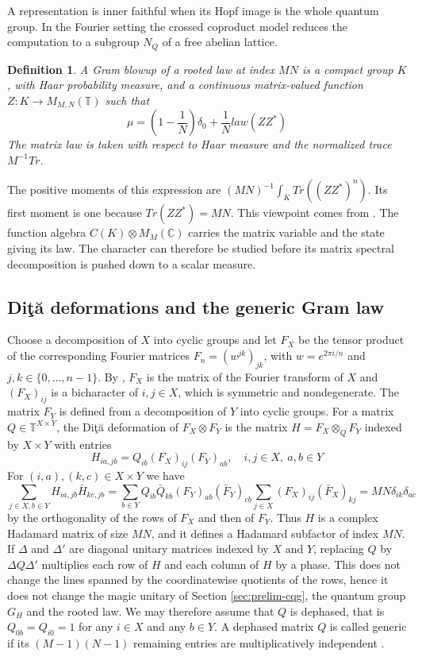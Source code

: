 \documentclass[11pt,reqno]{amsart}
\newtheorem{defi}[thm]{Definition}
\theoremstyle{definition}
\numberwithin{equation}{section}
\begin{document}
A representation is inner faithful when its Hopf image is the whole quantum group. In the Fourier setting the crossed coproduct model reduces the computation to a subgroup $N_Q$ of a free abelian lattice.

\begin{defi}
A Gram blowup of a rooted law at index $MN$ is a compact group $K$, with Haar probability measure, and a continuous matrix-valued function $Z:K\to M_{M,N}(\mathbb T)$ such that
$$\mu=\left(1-\frac1N\right)\delta_0+
\frac1N law(ZZ^*)$$
The matrix law is taken with respect to Haar measure and the normalized trace $M^{-1}Tr$.
\end{defi}

The positive moments of this expression are $(MN)^{-1}\int_K Tr((ZZ^*)^n)$. Its first moment is one because $Tr(ZZ^*)=MN$. This viewpoint comes from \cite{BBi15}. The function algebra $C(K)\otimes M_M(\mathbb C)$ carries the matrix variable and the state giving its law. The character can therefore be studied before its matrix spectral decomposition is pushed down to a scalar measure.

\subsection{Di\c t\u a deformations and the generic Gram law}

Choose a decomposition of $X$ into cyclic groups and let $F_X$ be the tensor product of the corresponding Fourier matrices $F_n=(w^{jk})_{jk}$, with $w=e^{2\pi i/n}$ and $j,k\in\{0,\ldots,n-1\}$. By \cite[Proposition 3.1 (2) and (3)]{BBi15}, $F_X$ is the matrix of the Fourier transform of $X$ and $(F_X)_{ij}$ is a bicharacter of $i,j\in X$, which is symmetric and nondegenerate. The matrix $F_Y$ is defined from a decomposition of $Y$ into cyclic groups. For a matrix $Q\in\mathbb T^{X\times Y}$, the Di\c t\u a deformation \cite{Dit04} of $F_X\otimes F_Y$ is the matrix $H=F_X\otimes_Q F_Y$ indexed by $X\times Y$ with entries
$$H_{ia,jb}=Q_{ib}(F_X)_{ij}(F_Y)_{ab},
\quad i,j\in X,\ a,b\in Y$$
For $(i,a),(k,c)\in X\times Y$ we have
$$\sum_{j\in X,b\in Y}H_{ia,jb}\bar H_{kc,jb}
=\sum_{b\in Y}Q_{ib}\bar Q_{kb}(F_Y)_{ab}(\bar F_Y)_{cb}\sum_{j\in X}(F_X)_{ij}(\bar F_X)_{kj}
=MN\delta_{ik}\delta_{ac}$$
by the orthogonality of the rows of $F_X$ and then of $F_Y$. Thus $H$ is a complex Hadamard matrix of size $MN$, and it defines a Hadamard subfactor of index $MN$. If $\Delta$ and $\Delta'$ are diagonal unitary matrices indexed by $X$ and $Y$, replacing $Q$ by $\Delta Q\Delta'$ multiplies each row of $H$ and each column of $H$ by a phase. This does not change the lines spanned by the coordinatewise quotients of the rows, hence it does not change the magic unitary of Section \ref{sec:prelim-cqg}, the quantum group $G_H$ and the rooted law. We may therefore assume that $Q$ is dephased, that is $Q_{0b}=Q_{i0}=1$ for any $i\in X$ and any $b\in Y$. A dephased matrix $Q$ is called generic if its $(M-1)(N-1)$ remaining entries are multiplicatively independent \cite[Definition 4.3]{BBi15}.
\end{document}
